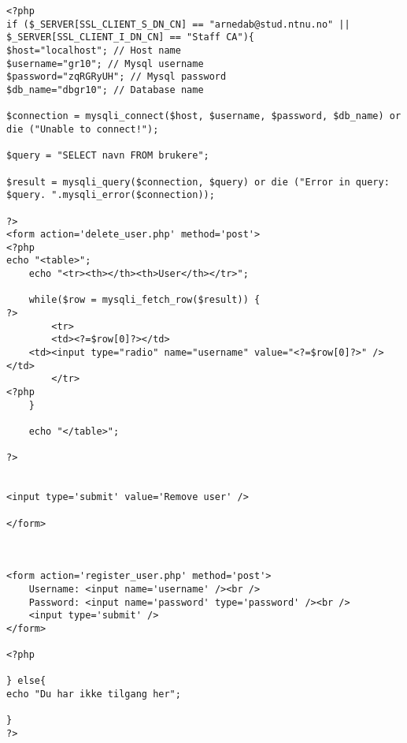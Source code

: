 \begin{lstlisting}
<?php
if ($_SERVER[SSL_CLIENT_S_DN_CN] == "arnedab@stud.ntnu.no" || $_SERVER[SSL_CLIENT_I_DN_CN] == "Staff CA"){
$host="localhost"; // Host name
$username="gr10"; // Mysql username
$password="zqRGRyUH"; // Mysql password
$db_name="dbgr10"; // Database name

$connection = mysqli_connect($host, $username, $password, $db_name) or die ("Unable to connect!");

$query = "SELECT navn FROM brukere";

$result = mysqli_query($connection, $query) or die ("Error in query: $query. ".mysqli_error($connection));

?>
<form action='delete_user.php' method='post'>
<?php
echo "<table>";
    echo "<tr><th></th><th>User</th></tr>";

    while($row = mysqli_fetch_row($result)) {
?>
        <tr>
        <td><?=$row[0]?></td>
	<td><input type="radio" name="username" value="<?=$row[0]?>" /></td>
        </tr>
<?php
    }

    echo "</table>";

?>


<input type='submit' value='Remove user' />

</form>



<form action='register_user.php' method='post'>
	Username: <input name='username' /><br />
	Password: <input name='password' type='password' /><br />
	<input type='submit' />
</form>

<?php

} else{
echo "Du har ikke tilgang her";

}
?>



\end{lstlisting}
